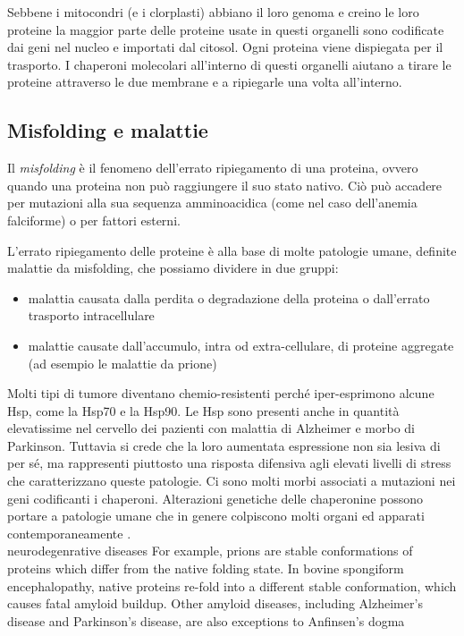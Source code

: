 Sebbene i mitocondri (e i clorplasti) abbiano il loro genoma e creino le loro proteine la maggior parte delle proteine usate in questi organelli sono codificate dai geni nel nucleo e importati dal citosol. Ogni proteina viene dispiegata per il trasporto. I chaperoni molecolari all'interno di questi organelli aiutano a tirare le proteine attraverso le due membrane e a ripiegarle una volta all'interno\supercite{alberts2018essential}.


\subsection{Misfolding e malattie}

Il \textit{misfolding} è il fenomeno dell'errato ripiegamento di una proteina, ovvero quando una proteina non può raggiungere il suo stato nativo. Ciò può accadere per mutazioni alla sua sequenza amminoacidica (come nel caso dell'anemia falciforme) o per fattori esterni.

L'errato ripiegamento delle proteine è alla base di molte patologie umane, definite malattie da misfolding, che possiamo dividere in due gruppi:

\begin{itemize}
	\item malattia causata dalla perdita o degradazione della proteina o dall'errato trasporto intracellulare
	\item malattie causate dall'accumulo, intra od extra-cellulare, di proteine aggregate (ad esempio le malattie da prione)
\end{itemize}

Molti tipi di tumore diventano chemio-resistenti perché iper-esprimono alcune Hsp, come la Hsp70 e la Hsp90. Le Hsp sono presenti anche in quantità elevatissime nel cervello dei pazienti con malattia di Alzheimer e morbo di Parkinson. Tuttavia si crede che la loro aumentata espressione non sia lesiva di per sé, ma rappresenti piuttosto una risposta difensiva agli elevati livelli di stress che caratterizzano queste patologie. Ci sono molti morbi associati a mutazioni nei geni codificanti i chaperoni. Alterazioni genetiche delle chaperonine possono portare a patologie umane che in genere colpiscono molti organi ed apparati contemporaneamente \supercite{chaperoninaWiki}. \\


neurodegenrative diseases
For example, prions are stable conformations of proteins which differ from the native folding state. In bovine spongiform encephalopathy, native proteins re-fold into a different stable conformation, which causes fatal amyloid buildup. Other amyloid diseases, including Alzheimer's disease and Parkinson's disease, are also exceptions to Anfinsen's dogma

